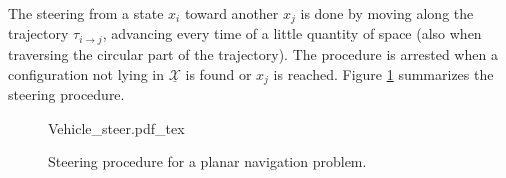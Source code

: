 The steering from a state $x_i$ toward another $x_j$ is done by moving along the trajectory $\tau_{i \rightarrow j}$, advancing every time of a little quantity of space (also when traversing the circular part of the trajectory).
The procedure is arrested when a configuration not lying in $\underline{\mathcal{X}}$ is found or $x_j$ is reached. Figure \ref{fig:vehicle_steer} summarizes the steering procedure.

 \begin{figure}
	 \centering
 \def\svgwidth{0.35 \columnwidth}
 {Vehicle_steer.pdf_tex} 
	 \caption{Steering procedure for a planar navigation problem.}
 \label{fig:vehicle_steer}
 \end{figure}

